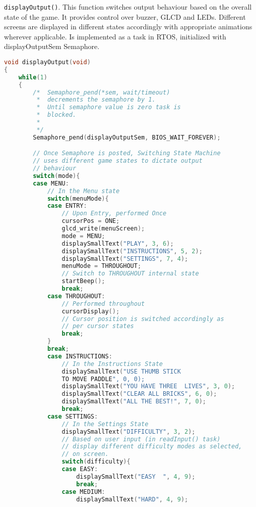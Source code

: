 \documentclass{article}
\begin{document}
\texttt{displayOutput()}. This function switches output behaviour based on the overall state of the game. It provides control over buzzer, GLCD and LEDs. Different screens are displayed in different states accordingly with appropriate animations wherever applicable. Is implemented as a task in RTOS, initialized with displayOutputSem Semaphore.
\begin{lstlisting}[basicstyle = \small, language = C]
void displayOutput(void)
{
    while(1)
    {
        /*  Semaphore_pend(*sem, wait/timeout) 
         *  decrements the semaphore by 1.
         *  Until semaphore value is zero task is 
         *  blocked.
         *
         */
        Semaphore_pend(displayOutputSem, BIOS_WAIT_FOREVER);

        // Once Semaphore is posted, Switching State Machine 
        // uses different game states to dictate output 
        // behaviour
        switch(mode){
        case MENU:
            // In the Menu state
            switch(menuMode){
            case ENTRY:
                // Upon Entry, performed Once
                cursorPos = ONE;
                glcd_write(menuScreen);
                mode = MENU;
                displaySmallText("PLAY", 3, 6);
                displaySmallText("INSTRUCTIONS", 5, 2);
                displaySmallText("SETTINGS", 7, 4);
                menuMode = THROUGHOUT; 
                // Switch to THROUGHOUT internal state
                startBeep();
                break;
            case THROUGHOUT:
                // Performed throughout
                cursorDisplay(); 
                // Cursor position is switched accordingly as 
                // per cursor states
                break;
            }
            break;
            case INSTRUCTIONS:
                // In the Instructions State
                displaySmallText("USE THUMB STICK 
                TO MOVE PADDLE", 0, 0);
                displaySmallText("YOU HAVE THREE  LIVES", 3, 0);
                displaySmallText("CLEAR ALL BRICKS", 6, 0);
                displaySmallText("ALL THE BEST!", 7, 0);
                break;
            case SETTINGS:
                // In the Settings State
                displaySmallText("DIFFICULTY", 3, 2);
                // Based on user input (in readInput() task) 
                // display different difficulty modes as selected, 
                // on screen.
                switch(difficulty){
                case EASY:
                    displaySmallText("EASY  ", 4, 9);
                    break;
                case MEDIUM:
                    displaySmallText("HARD", 4, 9);

\end{lstlisting}
\end{document}
